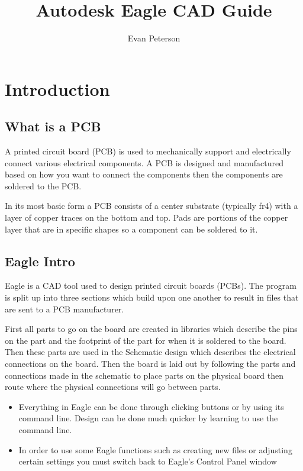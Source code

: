 \documentclass{article}
\title{Autodesk Eagle CAD Guide}
\author{Evan Peterson}
\begin{document}
\maketitle{}
\setcounter{tocdepth}{2}
\tableofcontents
\pagebreak

\section{Introduction}

\subsection{What is a PCB}
A printed circuit board (PCB) is used to mechanically support and electrically connect various electrical components. A PCB is designed and manufactured based on how you want to connect the components then the components are soldered to the PCB. \par
In its most basic form a PCB consists of a center substrate (typically fr4) with a layer of copper traces on the bottom and top. Pads are portions of the copper layer that are in specific shapes so a component can be soldered to it.

\subsection{Eagle Intro}
Eagle is a CAD tool used to design printed circuit boards (PCBs). The program is split up into three sections which build upon one another to result in files that are sent to a PCB manufacturer.\par
First all parts to go on the board are created in libraries which describe the pins on the part and the footprint of the part for when it is soldered to the board. Then these parts are used in the Schematic design which describes the electrical connections on the board. Then the board is laid out by following the parts and connections made in the schematic to place parts on the physical board then route where the physical connections will go between parts.
\begin{tcolorbox} [title=Tips \& Tricks]
    \begin{itemize}
        \item Everything in Eagle can be done through clicking buttons or by using its command line. Design can be done much quicker by learning to use the command line.
        \item In order to use some Eagle functions such as creating new files or adjusting certain settings you must switch back to Eagle's Control Panel window
    \end{itemize}
\end{tcolorbox}
\end{document}
